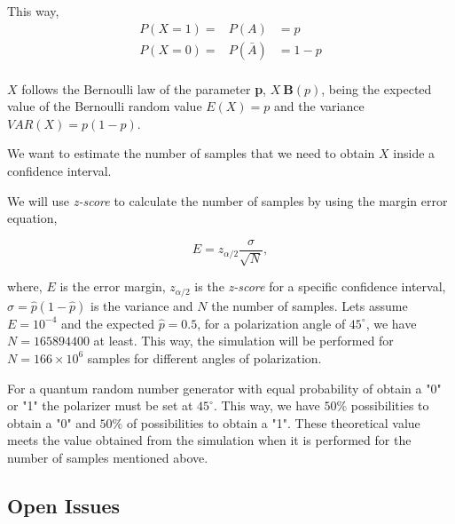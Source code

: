This way, 
\begin{eqnarray}
		P(X=1) =& P(A) & = p \nonumber\\
		P(X=0) =&P(\bar{A})&=1-p  \nonumber\\
\end{eqnarray}

$X$ follows the Bernoulli law of the parameter \textbf{p}, $X~\mathbf{B}(p)$, being the expected value of the Bernoulli random value $E(X)=p$ and the variance $VAR(X)=p(1-p)$.

We want to estimate the number of samples that we need to obtain $X$ inside a confidence interval.

We will use \textit{z-score} to calculate the number of samples by using the margin error equation,

\begin{equation}\label{eq:marginerror}
  E = z_{\alpha/2}\frac{\sigma}{\sqrt{N}},
  \nonumber
\end{equation}

where, $E$ is the error margin, $z_{\alpha/2}$ is the \textit{z-score} for a specific confidence interval, $\sigma = \hat{p}(1-\hat{p})$ is the variance and $N$ the number of samples. Lets assume $E=10^{-4}$ and the expected $\hat{p} = 0.5$, for a polarization angle of $45^{\circ}$, we have $N=165894400$ at least. This way, the simulation will be performed for $N=166 \times 10^{6}$ samples for different angles of polarization. 

For a quantum random number generator with equal probability of obtain a "0" or "1" the polarizer must be set at $45^{\circ}$. This way, we have $50\%$ possibilities to obtain a "0" and $50\%$ of possibilities to obtain a "1". These theoretical value meets the value obtained from the simulation when it is performed for the number of samples mentioned above.

\subsection{Open Issues}


\newpage




\cleardoublepage
